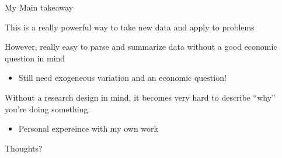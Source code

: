 \documentclass[notes,11pt, aspectratio=169]{beamer}
\newenvironment{wideitemize}{\itemize\addtolength{\itemsep}{10pt}}{\enditemize}
\begin{document}
  \begin{frame}{My Main takeaway}
    \begin{wideitemize}
    \item This is a really powerful way to take new data and apply to problems
    \item However, really easy to parse and summarize data without a good economic question in mind
      \begin{itemize}
      \item Still need exogeneous variation and an economic question!
      \end{itemize}
    \item Without a research design in mind, it becomes very hard to
      describe ``why'' you're doing something.
      \begin{itemize}
      \item Personal expereince with my own work
      \end{itemize}
    \item Thoughts?
    \end{wideitemize}
  \end{frame}
\end{document}
